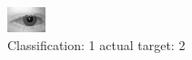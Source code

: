 \begin{figure}[h!]
\begin{center}
\includegraphics[width=0.60\columnwidth]{figures/ID460_class_1_target_2.png}
\end{center}
\caption{ Classification: 1 actual target: 2}
\label{fig:ID460_class_1_target_2}
\end{figure}
